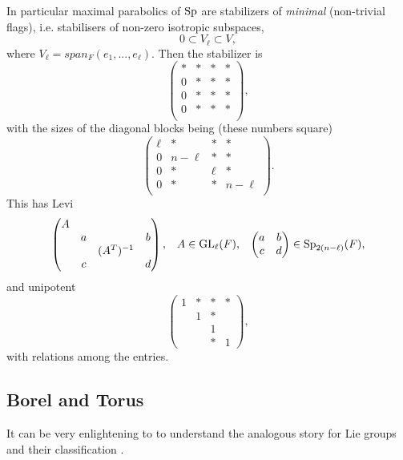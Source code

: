     \label{maximal_parabolic}
    In particular maximal parabolics of \(\operatorname{Sp}\) are stabilizers of \textit{minimal} (non-trivial flags), i.e. stabilisers of non-zero isotropic subspaces,
    \[0 \subset V_\ell \subset V,\]
    where \(V_\ell = span_F(e_1, ..., e_\ell)\). Then the stabilizer is 
    \[\begin{pmatrix}
        * &*&*&* \\
        0 &*&*&* \\
        0 &*&*&* \\
        0 &*&*&* \\
    \end{pmatrix},\]
    with the sizes of the diagonal blocks being (these numbers square)
    \[\begin{pmatrix}
        \ell &*&*&* \\
        0 &n-\ell&*&* \\
        0 &*&\ell&* \\
        0 &*&*&n-\ell \\
    \end{pmatrix}.\]
    This has Levi
    \[\begin{pmatrix}
        A &&& \\
         &a&&b \\
         &&(A^T)^{-1}& \\
         &c&&d \\
    \end{pmatrix}, \;\;\; A\in \operatorname{GL}_\ell(F), \;\;\; \begin{pmatrix}
        a & b\\
        c & d \\
    \end{pmatrix} \in \operatorname{Sp}_{2(n-\ell)}(F),\]
    and unipotent 
    \[\begin{pmatrix}
        1 &*&*&* \\
        & 1&*& \\
        && 1& \\
        &&*&1
    \end{pmatrix},\]
    with relations among the entries.

    \subsection{Borel and Torus}\label{borel_torus}
    \begin{remark}
        It can be very enlightening to to understand the analogous story for Lie groups and their classification \cite{hallLieGroupsLie2015}.
    \end{remark}
    

